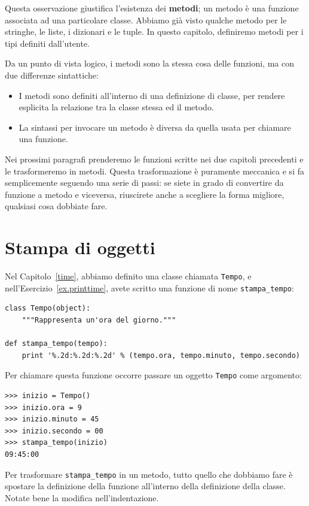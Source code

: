 \documentclass[10pt]{book}
\begin{document}
Questa osservazione giustifica l'esistenza dei {\bf metodi}; un metodo è una funzione associata ad una particolare classe. Abbiamo già visto qualche metodo per le stringhe, le liste, i dizionari e le tuple. In questo capitolo, definiremo metodi per i tipi definiti dall'utente.

Da un punto di vista logico, i metodi sono la stessa cosa delle funzioni, ma con due differenze sintattiche:

\begin{itemize}

\item I metodi sono definiti all'interno di una definizione di classe, per      rendere esplicita la relazione tra la classe stessa ed il metodo.

\item La sintassi per invocare un metodo è diversa da quella usata per       chiamare una funzione.

\end{itemize}

Nei prossimi paragrafi prenderemo le funzioni scritte nei due capitoli    precedenti e le trasformeremo in metodi. Questa trasformazione è puramente meccanica e si fa semplicemente seguendo una serie di passi: se siete in grado di convertire da funzione a metodo e viceversa, riuscirete anche a scegliere la forma migliore, qualsiasi cosa dobbiate fare.


\section{Stampa di oggetti}

Nel Capitolo~\ref{time}, abbiamo definito una classe chiamata
{\tt Tempo}, e nell'Esercizio~\ref{ex.printtime}, avete scritto una funzione di nome \verb"stampa_tempo":

\begin{verbatim}
class Tempo(object):
    """Rappresenta un'ora del giorno."""

def stampa_tempo(tempo):
    print '%.2d:%.2d:%.2d' % (tempo.ora, tempo.minuto, tempo.secondo)
\end{verbatim}
%
Per chiamare questa funzione occorre passare un oggetto {\tt Tempo} come    argomento:

\begin{verbatim}
>>> inizio = Tempo()
>>> inizio.ora = 9
>>> inizio.minuto = 45
>>> inizio.secondo = 00
>>> stampa_tempo(inizio)
09:45:00
\end{verbatim}
%
Per trasformare \verb"stampa_tempo" in un metodo, tutto quello che dobbiamo fare è spostare la definizione della funzione all'interno della definizione della classe. Notate bene la modifica nell'indentazione.
\end{document}
